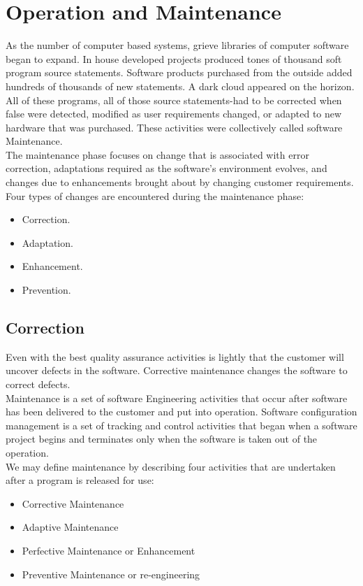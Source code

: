 \documentclass[12pt,a4 paper]{report}
\begin{document}
\chapter{Operation and Maintenance}
As the number of computer based systems, grieve libraries of computer software began to expand. In house developed projects produced tones of thousand soft program source statements. Software products purchased from the outside added hundreds of thousands of new statements. A dark cloud appeared on the horizon. All of these programs, all of those source statements-had to be corrected when false were detected, modified as user requirements changed, or adapted to new hardware that was purchased. These activities were collectively called software Maintenance. \\

The maintenance phase focuses on change that is associated with error correction, adaptations required as the software's environment evolves, and changes due to enhancements brought about by changing customer requirements. Four types of changes are encountered during the maintenance phase: 

\begin{itemize}
\item Correction.
\item Adaptation.
\item Enhancement. 
\item Prevention.
\end{itemize}

\section{Correction}
Even with the best quality assurance activities is lightly that the customer will uncover defects in the software. Corrective maintenance changes the software to correct defects. \\
 
Maintenance is a set of software Engineering activities that occur after software has been delivered to the customer and put into operation. Software configuration management is a set of tracking and control activities that began when a software project begins and terminates only when the software is taken out of the operation. \\
 
We may define maintenance by describing four activities that are undertaken after a program is released for use: 
\begin{itemize}
\item Corrective Maintenance 
\item Adaptive Maintenance 
\item Perfective Maintenance or Enhancement 
\item Preventive Maintenance or re-engineering 
\end{itemize}  
           
\end{document}
